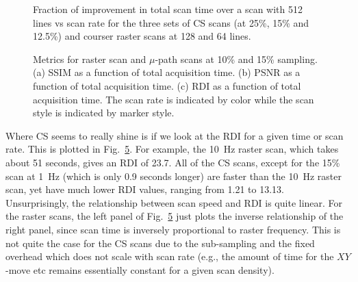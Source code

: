 \documentclass[twocolumn,oneside]{IEEEtran/IEEEtran}
\begin{document}
\begin{figure}
  
  \caption{Fraction of improvement in total scan time over a scan with 512 lines vs scan rate for the three sets of CS scans (at 25\%, 15\% and 12.5\%) and courser raster scans at 128 and 64 lines.}
  \label{fig:improve_512}
\end{figure}


\begin{figure}[ht!]
  \centering
  \begin{subfigure}{1\columnwidth}
    \centering
    
    \caption{}
    \label{fig:time_ssim}
  \end{subfigure}
  \begin{subfigure}{1\columnwidth}
    \centering
    
    \caption{}
    \label{fig:time_psnr}
  \end{subfigure}
  \begin{subfigure}{1\columnwidth}
    \centering
    
    \caption{}
    \label{fig:time_damage}
  \end{subfigure}
\caption{Metrics for raster scan and $\mu$-path scans at 10\% and 15\% sampling. (a) SSIM as a function of total acquisition time. (b) PSNR  as a function of total acquisition time. (c) RDI as a function of total acquisition time. The scan rate is indicated by color while the scan style is indicated by marker style.}
\end{figure}

Where CS seems to really shine is if we look at the RDI for a given time or scan
rate. This is plotted in Fig.~\ref{fig:time_damage}. For example, the 10~Hz
raster scan, which takes about 51 seconds, gives an RDI of 23.7. All of the CS
scans, except for the 15\% scan at 1~Hz (which is only 0.9 seconds longer) are
faster than the 10~Hz raster scan, yet have much lower RDI values, ranging from
1.21 to 13.13. Unsurprisingly, the relationship between scan speed and RDI is
quite linear. For the raster scans, the left panel of Fig.~\ref{fig:time_damage}
just plots the inverse relationship of the right panel, since scan time is
inversely proportional to raster frequency. This is not quite the case for the
CS scans due to the sub-sampling and the fixed overhead which does not scale
with scan rate (e.g., the amount of time for the $XY$-move etc remains
essentially constant for a given scan density).
\end{document}
